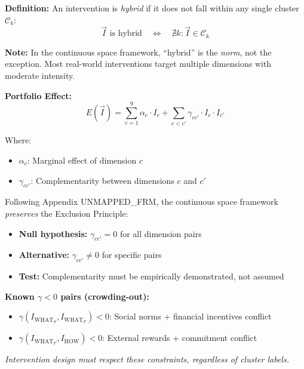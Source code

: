 \begin{tcolorbox}[colback=gray!5!white, colframe=gray!75!black,
    title=Definition HHH-D1: Interventions Outside Clusters]
\textbf{Definition:} An intervention is \textit{hybrid} if it does not fall within any single cluster $\mathcal{C}_k$:
\begin{equation}
\vec{I} \text{ is hybrid} \quad \Leftrightarrow \quad \nexists k: \vec{I} \in \mathcal{C}_k
\end{equation}

\textbf{Note:} In the continuous space framework, ``hybrid'' is the \textit{norm}, not the exception. Most real-world interventions target multiple dimensions with moderate intensity.

\textbf{Portfolio Effect:}
\begin{equation}
E(\vec{I}) = \sum_{c=1}^{9} \alpha_c \cdot I_c + \sum_{c < c'} \gamma_{cc'} \cdot I_c \cdot I_{c'}
\label{eq:hhh-portfolio-effect}
\end{equation}

Where:
\begin{itemize}[nosep]
    \item $\alpha_c$: Marginal effect of dimension $c$
    \item $\gamma_{cc'}$: Complementarity between dimensions $c$ and $c'$
\end{itemize}
\end{tcolorbox}

\begin{tcolorbox}[colback=red!5!white, colframe=red!75!black,
    title=\textbf{Methodological Note: Exclusion Principle in Continuous Space}]
Following Appendix UNMAPPED_FRM, the continuous space framework \textit{preserves} the Exclusion Principle:

\begin{itemize}[nosep]
    \item \textbf{Null hypothesis:} $\gamma_{cc'} = 0$ for all dimension pairs
    \item \textbf{Alternative:} $\gamma_{cc'} \neq 0$ for specific pairs
    \item \textbf{Test:} Complementarity must be empirically demonstrated, not assumed
\end{itemize}

\textbf{Known $\gamma < 0$ pairs (crowding-out):}
\begin{itemize}[nosep]
    \item $\gamma(I_{\text{WHAT}_S}, I_{\text{WHAT}_F}) < 0$: Social norms + financial incentives conflict
    \item $\gamma(I_{\text{WHAT}_F}, I_{\text{HOW}}) < 0$: External rewards + commitment conflict
\end{itemize}

\textit{Intervention design must respect these constraints, regardless of cluster labels.}
\end{tcolorbox}


